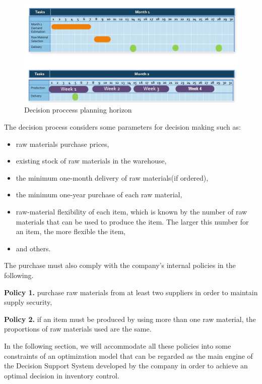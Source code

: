 \documentclass[preprint, 3p,
authoryear]{elsarticle} %
\providecommand{\tightlist}{%
  \setlength{\itemsep}{0pt}\setlength{\parskip}{0pt}}
\begin{document}
\begin{figure}

{\centering \includegraphics[width=0.8\linewidth]{Supply Cycle 2} 

}

\caption{Decision proccess planning horizon}\label{fig:unnamed-chunk-2}
\end{figure}

\newpage

The decision process considers some parameters for decision making such
as:

\begin{itemize}
\tightlist
\item
  raw materials purchase prices,
\item
  existing stock of raw materials in the warehouse,
\item
  the minimum one-month delivery of raw materials(if ordered),
\item
  the minimum one-year purchase of each raw material,
\item
  raw-material flexibility of each item, which is known by the number of
  raw materials that can be used to produce the item. The larger this
  number for an item, the more flexible the item,
\item
  and others.
\end{itemize}

The purchase must also comply with the company's internal policies in
the following.

\textbf{Policy 1.} purchase raw materials from at least two suppliers in
order to maintain supply security,

\textbf{Policy 2.} if an item must be produced by using more than one
raw material, the proportions of raw materials used are the same.

In the following section, we will accommodate all these policies into
some constraints of an optimization model that can be regarded as the
main engine of the Decision Support System developed by the company in
order to achieve an optimal decision in inventory control.
\end{document}
